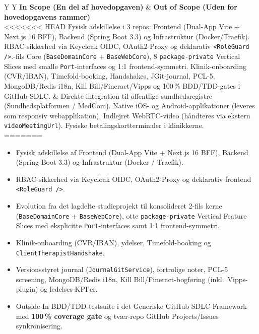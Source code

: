 \documentclass[11pt,a4paper]{article}
\begin{document}
\begin{table}[htbp]
\begin{table}[htbp]
\centering
\small
\begin{tabularx}{\textwidth}{Y Y}
\toprule
\textbf{In Scope (En del af hovedopgaven)} & \textbf{Out of Scope (Uden for hovedopgavens rammer)} \\
\midrule
<<<<<<< HEAD
Fysisk adskillelse i 3 repos: Frontend (Dual-App Vite + Next.js 16 BFF), Backend (Spring Boot 3.3) og Infrastruktur (Docker/Traefik).\newline
RBAC-sikkerhed via Keycloak OIDC, OAuth2-Proxy og deklarativ \texttt{<RoleGuard />}.-fils Core (\texttt{BaseDomainCore} + \texttt{BaseWebCore}), 8 \texttt{package-private} Vertical Slices med smalle \texttt{Port}-interfaces og 1:1 frontend-symmetri.\newline
Klinik-onboarding (CVR/IBAN), Timefold-booking, Handshakes, JGit-journal, PCL-5, MongoDB/Redis i18n, Kill Bill/Fineract/Vipps og 100\,\% BDD/TDD-gates i GitHub SDLC. &
Direkte integration til offentlige sundhedsregistre (Sundhedsplatformen / MedCom).\newline
Native iOS- og Android-applikationer (leveres som responsiv webapplikation).\newline
Indlejret WebRTC-video (håndteres via ekstern \texttt{videoMeetingUrl}).\newline
Fysiske betalingskortterminaler i klinikkerne. \\
=======
\begin{itemize}[leftmargin=*, nosep, topsep=2pt]
    \item Fysisk adskillelse af Frontend (Dual-App Vite + Next.js 16 BFF), Backend (Spring Boot 3.3) og Infrastruktur (Docker / Traefik).
    \item RBAC-sikkerhed via Keycloak OIDC, OAuth2-Proxy og deklarativ frontend \texttt{<RoleGuard />}.
    \item Evolution fra det lagdelte studieprojekt til konsolideret 2-fils kerne (\texttt{BaseDomainCore} + \texttt{BaseWebCore}), otte \texttt{package-private} Vertical Feature Slices med eksplicitte \texttt{Port}-interfaces samt 1:1 frontend-symmetri.
    \item Klinik-onboarding (CVR/IBAN), ydelser, Timefold-booking og \texttt{ClientTherapistHandshake}.
    \item Versionsstyret journal (\texttt{JournalGitService}), fortrolige noter, PCL-5 screening, MongoDB/Redis i18n, Kill Bill/Fineract-bogføring (inkl.\ Vipps-plugin) og ledelses-KPI'er.
    \item Outside-In BDD/TDD-testsuite i det Generiske GitHub SDLC-Framework med \textbf{100\,\% coverage gate} og tvær-repo GitHub Projects/Issues synkronisering.

\end{itemize}
\end{tabularx}
\end{table}
\end{table}
\end{document}
